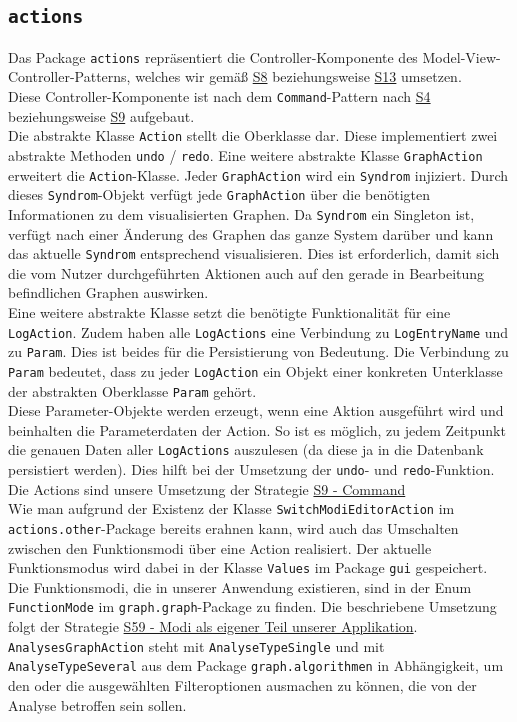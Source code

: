 \documentclass[enabledeprecatedfontcommands,fontsize=11pt,paper=a4,twoside]{scrartcl}
\newcounter{one}
\begin{document}
\subsection{\texttt{actions}}
Das Package \texttt{actions} repräsentiert die Controller-Komponente des Model-View-Controller-Patterns, welches wir gemäß \hyperlink{bbb}{S8} beziehungsweise \hyperlink{modelviewcontroller}{S13} umsetzen. \\ 
Diese Controller-Komponente ist nach dem \texttt{Command}-Pattern nach \hyperlink{zz}{S4} beziehungsweise \hyperlink{command}{S9} aufgebaut. \\

Die abstrakte Klasse \texttt{Action} stellt die Oberklasse dar. Diese implementiert zwei abstrakte Methoden \texttt{undo} / \texttt{redo}. Eine weitere abstrakte Klasse \texttt{GraphAction} erweitert die \texttt{Action}-Klasse. Jeder \texttt{GraphAction} wird ein \texttt{Syndrom} injiziert. Durch dieses \texttt{Syndrom}-Objekt verfügt jede \texttt{GraphAction} über die benötigten Informationen zu dem visualisierten Graphen. Da \texttt{Syndrom} ein Singleton ist, verfügt nach einer Änderung des Graphen das ganze System darüber und kann das aktuelle \texttt{Syndrom} entsprechend visualisieren.  Dies ist erforderlich, damit sich die vom Nutzer durchgeführten Aktionen auch auf den gerade in Bearbeitung befindlichen Graphen auswirken.\\ 
Eine weitere abstrakte Klasse setzt die benötigte Funktionalität für eine \texttt{LogAction}. Zudem haben alle \texttt{LogActions} eine Verbindung zu \texttt{LogEntryName} und zu \texttt{Param}. Dies ist beides für die Persistierung von Bedeutung. Die Verbindung zu \texttt{Param} bedeutet, dass zu jeder \texttt{LogAction} ein Objekt einer konkreten Unterklasse der abstrakten Oberklasse \texttt{Param} gehört. \\
Diese Parameter-Objekte werden erzeugt, wenn eine Aktion ausgeführt wird und beinhalten die Parameterdaten der Action. So ist es möglich, zu jedem Zeitpunkt die genauen Daten aller \texttt{LogActions} auszulesen (da diese ja in die Datenbank persistiert werden). Dies hilft bei der Umsetzung der \texttt{undo}- und \texttt{redo}-Funktion. Die Actions sind unsere Umsetzung der Strategie \hyperlink{xcc}{S9 - Command}  \\


Wie man aufgrund der Existenz der Klasse \texttt{SwitchModiEditorAction} im \texttt{actions.other}-Package bereits erahnen kann, wird auch das Umschalten zwischen den Funktionsmodi über eine Action realisiert. Der aktuelle Funktionsmodus wird dabei in der Klasse \texttt{Values} im Package \texttt{gui} gespeichert.  Die Funktionsmodi, die in unserer Anwendung existieren, sind in der Enum \texttt{FunctionMode} im \texttt{graph.graph}-Package zu finden. Die beschriebene Umsetzung folgt der Strategie \hyperlink{uuu}{S59 - Modi als eigener Teil unserer Applikation}.
\texttt{AnalysesGraphAction} steht mit \texttt{AnalyseTypeSingle} und mit \texttt{AnalyseTypeSeveral} aus dem Package \texttt{graph.algorithmen} in Abhängigkeit, um den oder die ausgewählten Filteroptionen ausmachen zu können, die von der Analyse betroffen sein sollen. \\
\end{document}
